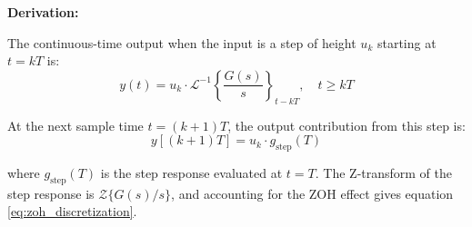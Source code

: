 \textbf{Derivation:}

The continuous-time output when the input is a step of height $u_k$ starting at $t = kT$ is:
\begin{equation}
y(t) = u_k \cdot \mathcal{L}^{-1}\left\{\frac{G(s)}{s}\right\}_{t-kT}, \quad t \geq kT
\end{equation}

At the next sample time $t = (k+1)T$, the output contribution from this step is:
\begin{equation}
y[(k+1)T] = u_k \cdot g_{\text{step}}(T)
\end{equation}

where $g_{\text{step}}(T)$ is the step response evaluated at $t = T$. The Z-transform of the step response is $\mathcal{Z}\{G(s)/s\}$, and accounting for the ZOH effect gives equation \eqref{eq:zoh_discretization}.

